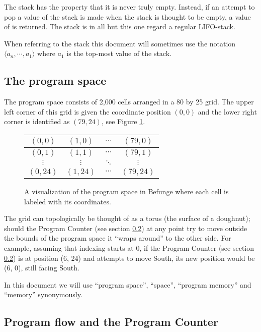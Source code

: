 \documentclass[12pt, a4paper]{article}
\begin{document}
The stack has the property that it is never truly empty. Instead, if an attempt to pop a value of the stack is made when the stack is thought to be empty, a value of  is returned. The stack is in all but this one regard a regular LIFO-stack.

When referring to the stack this document will sometimes use the notation $\langle a_n, \cdots, a_1 \rangle$ where $a_1$ is the top-most value of the stack.

\subsection{The program space}
\label{sec:space}

The program space consists of 2,000 cells arranged in a 80 by 25 grid. The upper left corner of this grid is given the coordinate position $(0, 0)$ and the lower right corner is identified as $(79, 24)$, see Figure \ref{fig:grid}.

\begin{figure}[!ht]
\centering
\begin{tabular}{|c|c|c|c|}
\hline
$(0, 0)$ & $(1, 0)$ & $\cdots$ & $(79, 0)$\\
\hline
$(0, 1)$ & $(1, 1)$ & $\cdots$ & $(79, 1)$\\
\hline
$\vdots$ & $\vdots$ & $\ddots$ & $\vdots$\\
\hline
$(0, 24)$ & $(1, 24)$ & $\cdots$ & $(79, 24)$\\
\hline
\end{tabular}
\caption{A visualization of the program space in Befunge where each cell is labeled with its coordinates.}
\label{fig:grid}
\end{figure}

The grid can topologically be thought of as a torus (the surface of a doughnut); should the Program Counter (see section \ref{sec:pc}) at any point try to move outside the bounds of the program space it “wraps around” to the other side. For example, assuming that indexing starts at 0, if the Program Counter (see section \ref{sec:pc}) is at position (6, 24) and attempts to move South, its new position would be (6, 0), still facing South.

In this document we will use “program space”, “space”, “program memory” and “memory” synonymously.

\subsection{Program flow and the Program Counter}
\label{sec:pc}
\end{document}
